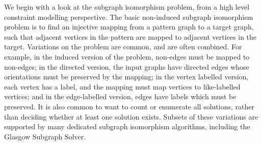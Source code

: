 \documentclass[runningheads]{llncs}
\begin{document}
We begin with a look at the subgraph isomorphism problem, from a high level constraint modelling
perspective.  The basic non-induced subgraph isomorphism problem is to find an injective mapping
from a pattern graph to a target graph, such that adjacent vertices in the pattern are mapped to
adjacent vertices in the target. Variations on the problem are common, and are often combined. For
example, in the induced version of the problem, non-edges must be mapped to non-edges; in the
directed version, the input graphs have directed edges whose orientations must be preserved by the
mapping; in the vertex labelled version, each vertex has a label, and the mapping must map vertices
to like-labelled vertices; and in the edge-labelled version, edges have labels which must be
preserved.  It is also common to want to count or enumerate all solutions, rather than deciding
whether at least one solution exists.  Subsets of these variations are supported by many
dedicated subgraph isomorphism algorithms, including the Glasgow Subgraph Solver.
\end{document}

